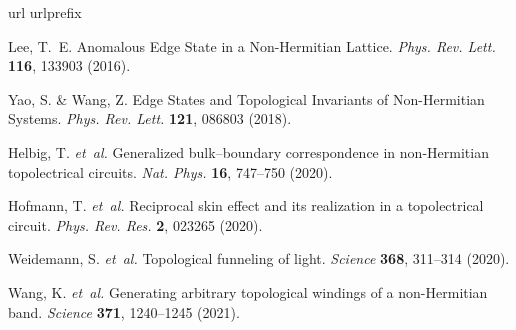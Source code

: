\documentclass[pdflatex,sn-nature,iicol]{sn-jnl}
\theoremstyle{thmstyleone}%
\theoremstyle{thmstyletwo}%
\theoremstyle{thmstylethree}%
\begin{document}
\begin{thebibliography}{10}
\expandafter\ifx\csname url\endcsname\relax
  \def\url#1{\burl{#1}}\fi
\expandafter\ifx\csname urlprefix\endcsname\relax\def\urlprefix{URL }\fi
\providecommand{\bibinfo}[2]{#2}
\providecommand{\eprint}[2][]{\url{#2}}
\providecommand{\doi}[1]{\url{https://doi.org/#1}}
\bibcommenthead

\bibinfo{author}{Lee, T.~E.}
\newblock \bibinfo{title}{Anomalous {{Edge State}} in a {{Non-Hermitian Lattice}}}.
\newblock \emph{\bibinfo{journal}{Phys. Rev. Lett.}} \textbf{\bibinfo{volume}{116}}, \bibinfo{pages}{133903} (\bibinfo{year}{2016}).

\bibinfo{author}{Yao, S.} \& \bibinfo{author}{Wang, Z.}
\newblock \bibinfo{title}{Edge {{States}} and {{Topological Invariants}} of {{Non-Hermitian Systems}}}.
\newblock \emph{\bibinfo{journal}{Phys. Rev. Lett.}} \textbf{\bibinfo{volume}{121}}, \bibinfo{pages}{086803} (\bibinfo{year}{2018}).

\bibinfo{author}{Helbig, T.} \emph{et~al.}
\newblock \bibinfo{title}{Generalized bulk--boundary correspondence in non-{{Hermitian}} topolectrical circuits}.
\newblock \emph{\bibinfo{journal}{Nat. Phys.}} \textbf{\bibinfo{volume}{16}}, \bibinfo{pages}{747--750} (\bibinfo{year}{2020}).

\bibinfo{author}{Hofmann, T.} \emph{et~al.}
\newblock \bibinfo{title}{Reciprocal skin effect and its realization in a topolectrical circuit}.
\newblock \emph{\bibinfo{journal}{Phys. Rev. Res.}} \textbf{\bibinfo{volume}{2}}, \bibinfo{pages}{023265} (\bibinfo{year}{2020}).

\bibinfo{author}{Weidemann, S.} \emph{et~al.}
\newblock \bibinfo{title}{Topological funneling of light}.
\newblock \emph{\bibinfo{journal}{Science}} \textbf{\bibinfo{volume}{368}}, \bibinfo{pages}{311--314} (\bibinfo{year}{2020}).

\bibinfo{author}{Wang, K.} \emph{et~al.}
\newblock \bibinfo{title}{Generating arbitrary topological windings of a non-{{Hermitian}} band}.
\newblock \emph{\bibinfo{journal}{Science}} \textbf{\bibinfo{volume}{371}}, \bibinfo{pages}{1240--1245} (\bibinfo{year}{2021}).


\end{thebibliography}
\end{document}
